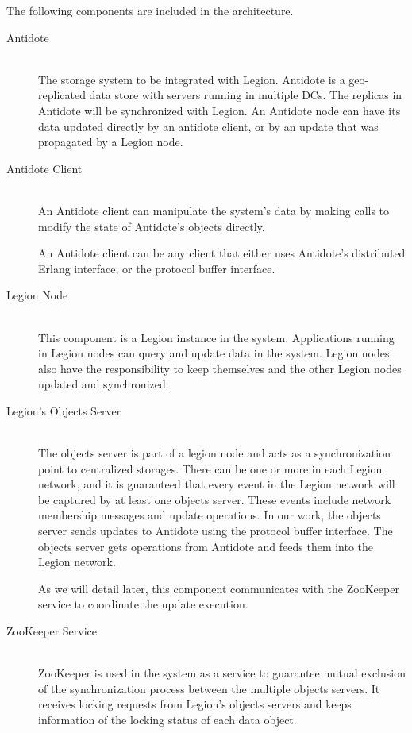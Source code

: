 \par
\clearpage 
	The following components are included in the architecture.
\begin{description}

\item[Antidote] \hfill \\
The storage system to be integrated with Legion. Antidote is a geo-replicated data store with servers running in multiple DCs. The replicas in Antidote will be synchronized with Legion. An Antidote node can have its data updated directly by an antidote client, or by an update that was propagated by a Legion node.\par

\item[Antidote Client] \hfill \\
An Antidote client can manipulate the system's data by making calls to modify the state of Antidote's objects directly.\par
	An Antidote client can be any client that either uses Antidote's distributed Erlang interface, or the protocol buffer interface.


\item[Legion Node] \hfill \\
This component is a Legion instance in the system. Applications running in Legion nodes can query and update data in the system. Legion nodes also have the responsibility to keep themselves and the other Legion nodes updated and synchronized.


\item[Legion's Objects Server] \hfill \\
The objects server is part of a legion node and acts as a synchronization point to centralized storages. There can be one or more in each Legion network, and it is guaranteed that every event in the Legion network will be captured by at least one objects server. These events include network membership messages and update operations. In our work, the objects server sends updates to Antidote using the protocol buffer interface. The objects server gets operations from Antidote and feeds them into the Legion network.\par
	As we will detail later, this component communicates with the ZooKeeper service to coordinate the update execution.

\item[ZooKeeper Service] \hfill \\
ZooKeeper is used in the system as a service to guarantee mutual exclusion of the synchronization process between the multiple objects servers. It receives locking requests from Legion's objects servers and keeps information of the locking status of each data object.

\end{description}

